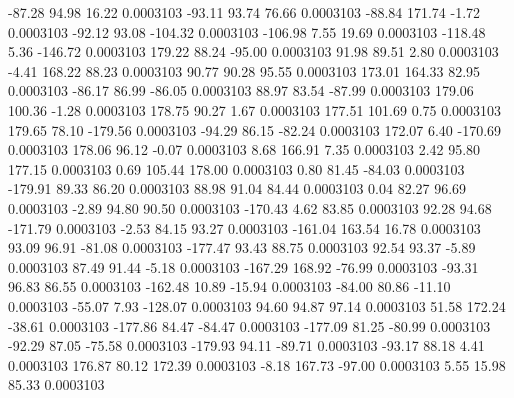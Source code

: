       -87.28       94.98       16.22     0.0003103
      -93.11       93.74       76.66     0.0003103
      -88.84      171.74       -1.72     0.0003103
      -92.12       93.08     -104.32     0.0003103
     -106.98        7.55       19.69     0.0003103
     -118.48        5.36     -146.72     0.0003103
      179.22       88.24      -95.00     0.0003103
       91.98       89.51        2.80     0.0003103
       -4.41      168.22       88.23     0.0003103
       90.77       90.28       95.55     0.0003103
      173.01      164.33       82.95     0.0003103
      -86.17       86.99      -86.05     0.0003103
       88.97       83.54      -87.99     0.0003103
      179.06      100.36       -1.28     0.0003103
      178.75       90.27        1.67     0.0003103
      177.51      101.69        0.75     0.0003103
      179.65       78.10     -179.56     0.0003103
      -94.29       86.15      -82.24     0.0003103
      172.07        6.40     -170.69     0.0003103
      178.06       96.12       -0.07     0.0003103
        8.68      166.91        7.35     0.0003103
        2.42       95.80      177.15     0.0003103
        0.69      105.44      178.00     0.0003103
        0.80       81.45      -84.03     0.0003103
     -179.91       89.33       86.20     0.0003103
       88.98       91.04       84.44     0.0003103
        0.04       82.27       96.69     0.0003103
       -2.89       94.80       90.50     0.0003103
     -170.43        4.62       83.85     0.0003103
       92.28       94.68     -171.79     0.0003103
       -2.53       84.15       93.27     0.0003103
     -161.04      163.54       16.78     0.0003103
       93.09       96.91      -81.08     0.0003103
     -177.47       93.43       88.75     0.0003103
       92.54       93.37       -5.89     0.0003103
       87.49       91.44       -5.18     0.0003103
     -167.29      168.92      -76.99     0.0003103
      -93.31       96.83       86.55     0.0003103
     -162.48       10.89      -15.94     0.0003103
      -84.00       80.86      -11.10     0.0003103
      -55.07        7.93     -128.07     0.0003103
       94.60       94.87       97.14     0.0003103
       51.58      172.24      -38.61     0.0003103
     -177.86       84.47      -84.47     0.0003103
     -177.09       81.25      -80.99     0.0003103
      -92.29       87.05      -75.58     0.0003103
     -179.93       94.11      -89.71     0.0003103
      -93.17       88.18        4.41     0.0003103
      176.87       80.12      172.39     0.0003103
       -8.18      167.73      -97.00     0.0003103
        5.55       15.98       85.33     0.0003103
